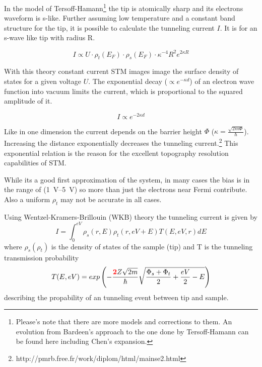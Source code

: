 In the model of Tersoff-Hamann\footnote{Please's note that there are more models and corrections to them. An evolution from Bardeen's approach to the one done by Tersoff-Hamann can be found here \cite{lounis_theory_2014, wortmann_interpretation_2000} including Chen's expansion.} the tip is atomically sharp and its electrons waveform is s-like. Further assuming low temperature and a constant band structure for the tip, it is possible to calculate 
the tunneling current $I$. It is for an s-wave like tip with radius R. 

$$I \propto U \cdot \rho_t(E_F) \cdot \rho_s(E_F) \cdot \kappa^{-4}R^2e^{2\kappa R} $$

With this theory constant current STM images image the surface density of states for  a given voltage $U$. The exponential decay ($\propto e^{-\kappa d}$) of an electron wave function into vacuum limits the current, which is proportional to the squared amplitude of it. 

$$I\propto e^{-2\kappa d}$$

Like in one dimension the current depends on the barrier height $\Phi$ ($\kappa=\frac{\sqrt{2m\Phi}}{\hbar}$). 
Increasing the distance exponentially decreases the tunneling current.\footnote{http://pmrb.free.fr/work/diplom/html/mainse2.html} This exponential relation is the reason for the excellent topography resolution capabilities of STM.

While its a good first approximation of the system, in many cases the bias is in the range of (\SIrange{1}{5}{\V}) so more than just the electrons near Fermi contribute. Also a uniform $\rho_t$ may not be accurate in all cases.

Using  Wentzel-Kramers-Brillouin (WKB) theory\cite{wentzel_verallgemeinerung_1926, kramers_wellenmechanik_1926, brillouin_mecanique_1926} the tunneling current is given by
\begin{equation}
I=\int_0^{eV}\rho_s(r,E)\rho_t(r,eV+E)T(E,eV,r)dE
\label{WKB}
\end{equation}
where $\rho_s(\rho_t)$ is the density of states of the sample (tip) and T is the tunneling transmission probability
\begin{equation}
T(E,eV)=exp\left(-\frac{\textcolor{red}{\textbf{2}}Z\sqrt{2m}}{\hbar}\sqrt{\frac{\Phi_s+\Phi_t}{2}+\frac{eV}{2}-E}\right)
\label{Transmission-function} 
\end{equation}
describing the propability of an tunneling event between tip and sample.

